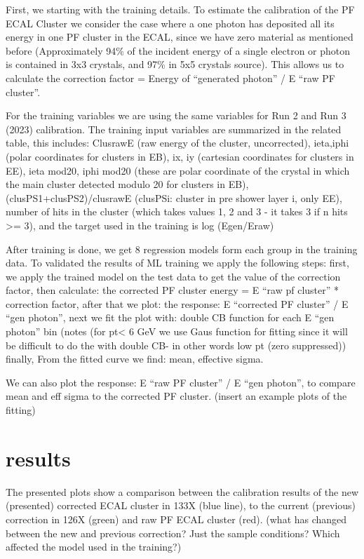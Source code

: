 First, we starting with the training details. To estimate the calibration of the PF ECAL Cluster we consider the case where a one photon has deposited all its energy in one PF cluster in the ECAL, since we have zero material as mentioned before (Approximately 94\% of the incident energy of a single electron or photon is contained in 3x3 crystals, and 97\% in 5x5 crystals source).  
This allows us to calculate the correction factor = Energy of “generated photon” / E “raw PF cluster”.

For the training variables we are using the same variables for Run 2 and Run 3 (2023) calibration. The training input variables are summarized in the related table, this includes:  
ClusrawE (raw energy of the cluster, uncorrected), 
ieta,iphi (polar coordinates for clusters in EB), 
ix, iy (cartesian coordinates for clusters in EE), 
ieta mod20, iphi mod20 (these are polar coordinate of the crystal in which the main cluster detected modulo 20 for clusters in EB), 
(clusPS1+clusPS2)/clusrawE (clusPSi: cluster in pre shower layer i, only EE), 
 number of hits in the cluster (which takes values 1, 2 and 3 - it takes 3 if n hits >= 3), 
and the target used in the training is log (Egen/Eraw)  

After training is done, we get 8 regression models form each group in the training data. To validated the results of ML training we apply the following steps: 
first, we apply the trained model on the test data to get the value of the correction factor, 
then calculate:  the corrected PF cluster energy = E “raw pf cluster” * correction factor, 
after that we plot: the response: E “corrected PF cluster” / E “gen photon”, 
next we fit the plot with: double CB function for each E “gen photon” bin (notes (for pt< 6 GeV we use Gaus function for fitting since it will be difficult to do the with double CB- in other words low pt (zero suppressed)) 
finally, From the fitted curve we find: mean, effective sigma.  

We can also plot the response: E “raw PF cluster” / E “gen photon”, to compare mean and eff sigma to the corrected PF cluster. (insert an example plots of the fitting)   
\section{results}

The presented plots show a comparison between the calibration results of the new (presented) corrected ECAL cluster in 133X (blue line), to the current (previous) correction in 126X (green) and raw PF ECAL cluster (red). (what has changed between the new and previous correction? Just the sample conditions? Which affected the model used in the training?)  

